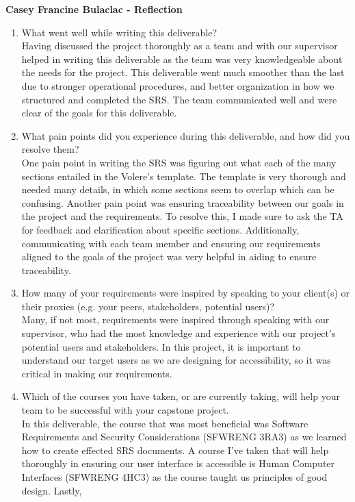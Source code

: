\textbf{Casey Francine Bulaclac - Reflection}
\begin{enumerate}
  \item What went well while writing this deliverable? \\[1ex]
  Having discussed the project thoroughly as a team and with our supervisor helped in writing this deliverable as the team
  was very knowledgeable about the needs for the project. 
  This deliverable went much smoother than the last due to stronger operational procedures, and better organization in how we structured and completed the SRS. 
  The team communicated well and were clear of the goals for this deliverable.
  \item What pain points did you experience during this deliverable, and how did
  you resolve them?\\[1ex]
  One pain point in writing the SRS was figuring out what each of the many sections entailed in the Volere's template. The template 
  is very thorough and needed many details, in which some sections seem to overlap which can be confusing. Another pain point was ensuring traceability
  between our goals in the project and the requirements. To resolve this, I made sure to ask the TA for feedback and clarification about specific sections.
  Additionally, communicating with each team member and ensuring our requirements aligned to the goals of the project was very helpful in aiding to ensure
  traceability.
  \item How many of your requirements were inspired by speaking to your
  client(s) or their proxies (e.g. your peers, stakeholders, potential users)? \\[1ex]
  Many, if not most, requirements were inspired through speaking with our supervisor, who had the most knowledge and experience with our project's 
  potential users and stakeholders. In this project, it is important to understand our target users as we are designing for accessibility, so it was critical 
  in making our requirements. 
  \item Which of the courses you have taken, or are currently taking, will help
  your team to be successful with your capstone project.\\[1ex]
  In this deliverable, the course that was most beneficial was Software Requirements and Security Considerations (SFWRENG 3RA3) as we learned how to create effected SRS documents.
  A course I've taken that will help thoroughly in ensuring our user interface is accessible is Human Computer Interfaces (SFWRENG 4HC3) as the course taught us principles of good design. Lastly,

\end{enumerate}

